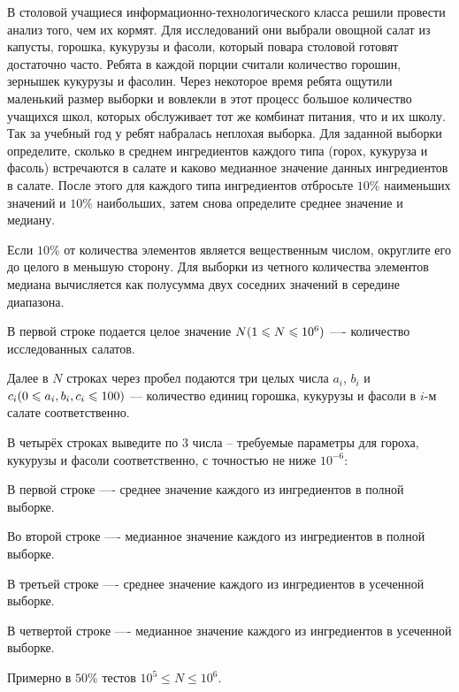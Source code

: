 
В столовой учащиеся информационно-технологического класса решили провести анализ того, чем их кормят. Для исследований они выбрали овощной салат из капусты, горошка, кукурузы и фасоли, который повара столовой готовят достаточно часто. Ребята в каждой порции считали количество горошин, зернышек кукурузы и фасолин. Через некоторое время ребята ощутили маленький размер выборки и вовлекли в этот процесс большое количество учащихся школ, которых обслуживает тот же комбинат питания, что и их школу. Так за учебный год у ребят набралась неплохая выборка. Для заданной выборки определите, сколько в среднем ингредиентов каждого типа (горох, кукуруза и фасоль) встречаются в салате и каково медианное значение данных ингредиентов в салате. После этого для каждого типа ингредиентов отбросьте $10\%$  наименьших значений и $10\%$  наибольших, затем снова определите среднее значение и медиану.

\explanationSection

Если $10\%$ от количества элементов является вещественным числом, округлите его до целого в меньшую сторону. Для выборки из четного количества элементов медиана вычисляется как полусумма двух соседних значений в середине диапазона.


В первой строке подается целое значение $ N \space (1 \leq N \leq 10^6) $ —- количество исследованных салатов. 

Далее в $ N $ строках через пробел подаются три целых числа $ a_i $, $ b_i $ и $ c_i\space (0 \leq a_i, b_i, c_i \leq 100) $ — количество единиц горошка, кукурузы и фасоли в $i$-м салате соответственно.

\outputfmtSection

В четырёх строках выведите по 3 числа -- требуемые параметры для гороха, кукурузы и фасоли соответственно, с точностью не ниже $10^{-6}$:

В первой строке —- среднее значение каждого из ингредиентов в полной выборке.

Во второй строке —- медианное значение каждого из ингредиентов в полной выборке.

В третьей строке —- среднее значение каждого из ингредиентов в усеченной выборке.

В четвертой строке —- медианное значение каждого из ингредиентов в усеченной выборке.

\markSection

Примерно в $ 50\% $ тестов $ 10^5 \leq N \leq 10^6$.

